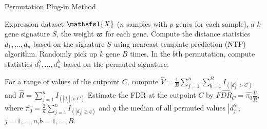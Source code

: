 \documentclass{article}
\renewcommand{\vec}[1]{\mbox{\boldmath$#1$}}
\newcommand{\tensor}[1]{\mathsfsl{#1}}
\begin{document}
\begin{algorithm}[H]
\caption{Permutation Plug-in Method}
\label{perm-plug-in}
\begin{algorithmic}[1]
\REQUIRE Expression dataset $\tensor{X}$ ($n$ samples with $p$ genes for each sample), a $k$-gene signature $S$, the weight $\vec{w}$ for each gene.
\STATE Compute the distance statistics $d_1,\ldots,d_n$ based on the signature $S$ using neareast template prediction (NTP) algorithm.
\STATE Randomly pick up $k$ gene $B$ times. In the $b$th permutation, compute statistics $d_1^b,\ldots,d_n^b$ based on the permuted signature.
      
\STATE For a range of values of the cutpoint $C$, compute $\hat{V} = \frac{1}{B}\sum_{j=1}^n\sum_{b=1}^BI_{(|d_j^b| >C)}$, and $\hat{R} = \sum_{j=1}^nI_{(|d_j|>C)}$
\STATE Estimate the FDR at the cutpoint $C$ by $\hat{FDR_C}=\hat{\pi_0}\frac{\hat{V}}{\hat{R}}$, where $\hat{\pi_0}=\frac{2}{n}\sum_{j=1}^nI_{(|d_j|\ge q)}$ and $q$ the median of all permuted values $|d_j^b|$, $j = 1,\ldots,n$,$b=1,\ldots,B$.
\end{algorithmic}
\end{algorithm}





  
\end{document}
